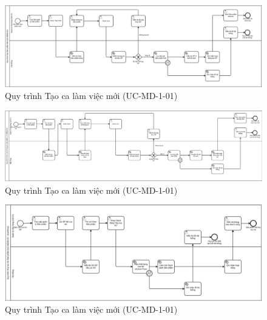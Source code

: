 
\begin{figure}[H]
	\centering
	\includegraphics[width=15cm]{Sections/tong_quan/functional_spec/img/2.1.png}

     \vspace{0.5cm}
    \caption{Quy trình Tạo ca làm việc mới (UC-MD-1-01)}
\end{figure}


\begin{figure}[H]
	\centering
	\includegraphics[width=15cm]{Sections/tong_quan/functional_spec/img/2.2.png}

     \vspace{0.5cm}
    \caption{Quy trình Tạo ca làm việc mới (UC-MD-1-01)}
\end{figure}

\begin{figure}[H]
	\centering
	\includegraphics[width=15cm]{Sections/tong_quan/functional_spec/img/2.3.1.png}

     \vspace{0.5cm}
    \caption{Quy trình Tạo ca làm việc mới (UC-MD-1-01)}
\end{figure}

